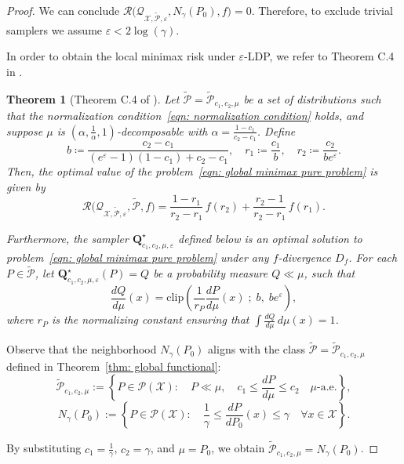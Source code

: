 \documentclass[accepted]{article}
\theoremstyle{plain} %
\newtheorem{theorem}{Theorem}[section]
\theoremstyle{definition}
\theoremstyle{remark}
\newcommand{\eps}{\varepsilon}
\newcommand{\bQ}{\mathbf{Q}}
\begin{document}
\begin{proof}
We can conclude $\mathcal{R}\big(\mathcal{Q}_{\mathcal{X},\tilde{\mathcal{P}},\eps},N_\gamma(P_0),f\big) = 0$. Therefore, to exclude trivial samplers we assume $\eps < 2\log(\gamma)$.

In order to obtain the local minimax risk under $\varepsilon$-LDP, we refer to Theorem C.4 in \citet{park2024exactly}.

\begin{theorem}[Theorem C.4 of \citet{park2024exactly}]\label{thm: global pure}
Let $\tilde{\mathcal{P}} = \tilde{\mathcal{P}}_{c_1, c_2, \mu}$ be a set of distributions such that the normalization condition~\eqref{eqn: normalization condition} holds, and suppose $\mu$ is $(\alpha,\frac{1}{\alpha},1)$-decomposable with $\alpha = \frac{1 - c_1}{c_2 - c_1}$. Define
\[
b \coloneqq \frac{c_2 - c_1}{(e^\varepsilon - 1)(1 - c_1) + c_2 - c_1}, \quad
r_1 \coloneqq \frac{c_1}{b}, \quad
r_2 \coloneqq \frac{c_2}{b e^\varepsilon}.
\]
Then, the optimal value of the problem~\eqref{eqn: global minimax pure problem} is given by
\[
\mathcal{R}\big(\mathcal{Q}_{\mathcal{X}, \tilde{\mathcal{P}}, \varepsilon}, \tilde{\mathcal{P}}, f\big)
= \frac{1 - r_1}{r_2 - r_1} \, f(r_2) + \frac{r_2 - 1}{r_2 - r_1} \, f(r_1).
\]

Furthermore, the sampler $\bQ^\star_{c_1, c_2, \mu, \varepsilon}$ defined below is an optimal solution to problem~\eqref{eqn: global minimax pure problem} under any $f$-divergence $D_f$. For each \(P \in \tilde{\mathcal{P}}\), let \(\bQ^\star_{c_1, c_2, \mu, \varepsilon}(P) = Q\) be a probability measure $Q \ll \mu$, such that
\[
\frac{dQ}{d\mu}(x) 
= 
\mathrm{clip}\left(
\frac{1}{r_P} \frac{dP}{d\mu}(x)
\;;\;
b,
\; b e^\varepsilon
\right),
\]
where \(r_P\) is the normalizing constant ensuring that \(\int \frac{dQ}{d\mu} \, d\mu(x) = 1\).
\end{theorem}

Observe that the neighborhood \(N_\gamma(P_0)\) aligns with the class 
\(\tilde{\mathcal{P}} = \tilde{\mathcal{P}}_{c_1, c_2, \mu}\) defined in Theorem~\ref{thm: global functional}:
\[
\tilde{\mathcal{P}}_{c_1, c_2, \mu}
:= \left\{ P \in \mathcal{P}(\mathcal{X}) : \quad P \ll \mu, \quad 
c_1 \leq \frac{dP}{d\mu} \leq c_2 \quad \mu\text{-a.e.} \right\},
\]
\[
N_\gamma(P_0) := \left\{ P \in \mathcal{P}(\mathcal{X}) : \quad 
\frac{1}{\gamma} \leq \frac{dP}{dP_0}(x) \leq \gamma \quad \forall x \in \mathcal{X} \right\}.
\]

By substituting \(c_1 = \tfrac{1}{\gamma}\), \(c_2 = \gamma\), and \(\mu = P_0\), we obtain 
\(\tilde{\mathcal{P}}_{c_1, c_2, \mu} = N_\gamma(P_0)\).


\end{proof}
\end{document}
